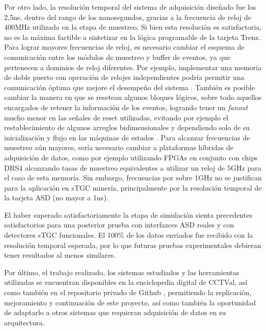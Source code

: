 Por otro lado, la resolución temporal del sistema de adquisición diseñado fue los 2,5ns, dentro del rango de los nanosegundos, gracias a la frecuencia de reloj de 400MHz utilizada en la etapa de muestreo. Si bien esta resolución es satisfactoria, no es la máxima factible a sintetizar en la lógica programable de la tarjeta Trenz. Para lograr mayores frecuencias de reloj, es necesario cambiar el esquema de comunicación entre los módulos de muestreo y buffer de eventos, ya que pertenecen a dominios de reloj diferentes. Por ejemplo, implementar una memoria de doble puerto con operación de relojes independientes podría permitir una comunicación óptima que mejore el desempeño del sistema . También es posible cambiar la manera en que se resetean algunos bloques lógicos, sobre todo aquellos encargados de retener la información de los eventos, logrando tener un \textit{fanout} mucho menor en las señales de reset utilizadas, evitando por ejemplo el restablecimiento de algunos arreglos bidimensionales y dependiendo solo de su inicialización y flujo en las máquinas de estados . Para alcanzar frecuencias de muestreo aún mayores, sería necesario cambiar a plataformas híbridas de adquisición de datos, como por ejemplo utilizando FPGAs en conjunto con chips DRS4\cite{RittDRS4Array} alcanzando tasas de muestreo equivalentes a utilizar un reloj de 5GHz para el caso de esta memoria. Sin embargo, frecuencias por sobre 1GHz no se justifican para la aplicación en sTGC minería, principalmente por la resolución temporal de la tarjeta ASD (no mayor a 1ns).

El haber superado satisfactoriamente la etapa de simulación sienta precedentes satisfactorios para una posterior prueba con interfazces ASD reales y con detectores sTGC funcionales. El 100\% de los datos enviados fue recibido con la resolución temporal esperada, por lo que futuras pruebas experimentales debieran tener resultados al menos similares.

Por último, el trabajo realizado, los sistemas estudiados y las herramientas utilizadas se encuentran disponibles en la enciclopedia digital de CCTVal, así como también en el repositorio privado de Github \cite{GonzalezMuonRepository} , permitiendo la replicación, mejoramiento y continuación de este proyecto, así como también la oportunidad de adaptarlo a otros sistemas que requieran adquisición de datos en su arquitectura.


